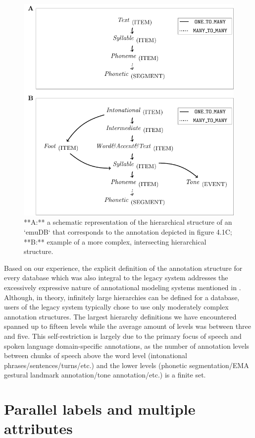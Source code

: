 \documentclass[]{book}
\theoremstyle{definition}
\theoremstyle{definition}
\theoremstyle{definition}
\theoremstyle{remark}
\begin{document}
\begin{figure}

{\centering \includegraphics[width=0.75\linewidth]{pics/annotStruct} 

}

\caption{**A:** a schematic representation of the hierarchical structure of an `emuDB` that corresponds to the annotation depicted in figure 4.1C; **B:** example of a more complex, intersecting hierarchical structure.}\label{fig:annotStruct}
\end{figure}

Based on our experience, the explicit definition of the annotation
structure for every database which was also integral to the legacy
system addresses the excessively expressive nature of annotational
modeling systems mentioned in \citet{bird:sc2001a}. Although, in theory,
infinitely large hierarchies can be defined for a database, users of the
legacy system typically chose to use only moderately complex annotation
structures. The largest hierarchy definitions we have encountered
spanned up to fifteen levels while the average amount of levels was
between three and five. This self-restriction is largely due to the
primary focus of speech and spoken language domain-specific annotations,
as the number of annotation levels between chunks of speech above the
word level (intonational phrases/sentences/turns/etc.) and the lower
levels (phonetic segmentation/EMA gestural landmark annotation/tone
annotation/etc.) is a finite set.

\hypertarget{parallel-labels-and-multiple-attributes}{%
\section{Parallel labels and multiple
attributes}\label{parallel-labels-and-multiple-attributes}}
\end{document}
